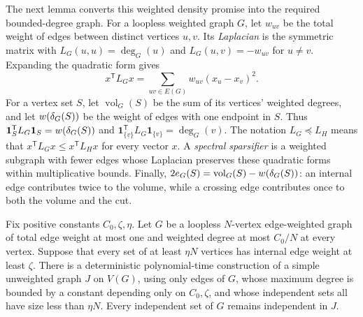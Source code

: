 The next lemma converts this weighted density promise into the
required bounded-degree graph. For a loopless weighted graph $G$,
let $w_{uv}$ be the total weight of edges between distinct vertices
$u,v$. Its \emph{Laplacian} is the symmetric matrix with
$L_G(u,u)=\deg_G(u)$ and $L_G(u,v)=-w_{uv}$ for $u\ne v$.
Expanding the quadratic form gives
\[
 x^{\mathsf T}L_Gx
 =\sum_{uv\in E(G)}w_{uv}(x_u-x_v)^2.
\]
For a vertex set $S$, let $\operatorname{vol}_G(S)$ be the sum of
its vertices' weighted degrees, and let $w(\delta_G(S))$ be the
weight of edges with one endpoint in $S$. Thus
$\mathbf1_S^{\mathsf T}L_G\mathbf1_S=w(\delta_G(S))$ and
$\mathbf1_{\{v\}}^{\mathsf T}L_G\mathbf1_{\{v\}}=\deg_G(v)$.
The notation $L_G\preceq L_H$ means that
$x^{\mathsf T}L_Gx\le x^{\mathsf T}L_Hx$ for every vector $x$.
A \emph{spectral sparsifier} is a weighted subgraph with fewer
edges whose Laplacian preserves these quadratic forms within
multiplicative bounds. Finally,
$2e_G(S)=\operatorname{vol}_G(S)-w(\delta_G(S))$: an internal edge
contributes twice to the volume, while a crossing edge contributes
once to both the volume and the cut.

\begin{lemma}\label{lem:deterministic-density-sparsification}
Fix positive constants $C_0,\zeta,\eta$. Let $G$ be a loopless
$N$-vertex edge-weighted graph of total edge weight at most one
and weighted degree at most $C_0/N$ at every vertex. Suppose that
every set of at least $\eta N$ vertices has internal edge weight
at least $\zeta$. There is a deterministic polynomial-time
construction of a simple unweighted graph $J$ on $V(G)$, using only
edges of $G$, whose
maximum degree is bounded by a constant depending only on
$C_0,\zeta$, and whose independent sets all have size less than
$\eta N$. Every independent set of $G$ remains independent in $J$.
\end{lemma}

